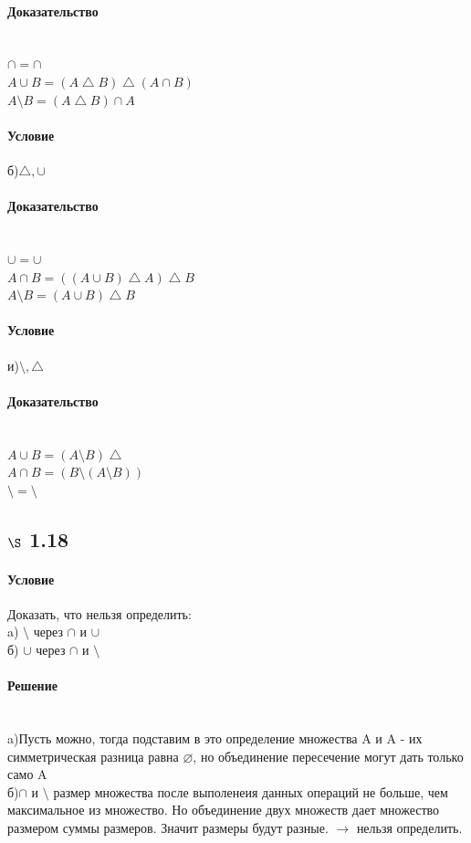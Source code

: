 \documentclass[a4paper,12pt]{article}
\begin{document}
\paragraph*{Доказательство} \mbox{}\\
$\cap = \cap $\\
$ A \cup B = (A \bigtriangleup B) \bigtriangleup ( A \cap B)$\\
$ A \setminus B =  (A \bigtriangleup B) \cap A$
\paragraph*{Условие}
б)$\bigtriangleup, \cup$
\paragraph*{Доказательство} \mbox{}\\
$\cup = \cup $\\
$ A \cap B = ((A \cup B) \bigtriangleup A) \bigtriangleup B $\\
$ A \setminus B =  (A \cup B) \bigtriangleup B$
\paragraph*{Условие}
и)$\setminus, \bigtriangleup$
\paragraph*{Доказательство} \mbox{}\\
$ A \cup B = (A \setminus B) \bigtriangleup $\\
$ A \cap B = (B \setminus (A \setminus B)) $\\
$ \setminus =  \setminus$

\subsection*{$\S$ 1.18}
\paragraph*{Условие}
Доказать, что нельзя определить:\\
a) $\setminus$ через $\cap$ и $\cup $\\
б) $\cup$ через $\cap$ и $\setminus $
\paragraph*{Решение} \mbox{}\\
a)Пусть можно, тогда подставим в это определение множества A и A - их симметрическая разница равна $\varnothing$, но объединение пересечение могут дать только само A\\
б)$\cap$ и $\setminus $ размер множества после выполенеия данных операций не больше, чем максимальное из множество. Но объединение двух множеств дает множество размером суммы размеров. Значит размеры будут разные. $\rightarrow$ нельзя определить.
\end{document}
